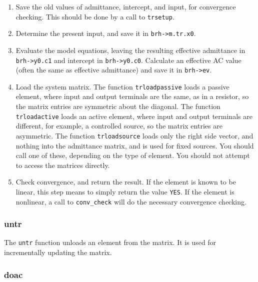 \begin{enumerate}

\item Save the old values of admittance, intercept, and input, for
convergence checking.  This should be done by a call to {\tt trsetup}.

\item Determine the present input, and save it in {\tt brh->m.tr.x0}.

\item Evaluate the model equations, leaving the resulting effective
admittance in {\tt brh->y0.c1} and intercept in {\tt brh->y0.c0}.  Calculate
an effective AC value (often the same as effective admittance) and save it
in {\tt brh->ev}.

\item Load the system matrix.  The function {\tt trloadpassive} loads a
passive element, where input and output terminals are the same, as in a
resistor, so the matrix entries are symmetric about the diagonal.  The
function {\tt trloadactive} loads an active element, where input and output
terminals are different, for example, a controlled source, so the matrix
entries are asymmetric.  The function {\tt trloadsource} loads only the
right side vector, and nothing into the admittance matrix, and is used for
fixed sources.  You should call one of these, depending on the type of
element.  You should not attempt to access the matrices directly.

\item Check convergence, and return the result.  If the element is known to
be linear, this step means to simply return the value {\tt YES}.  If the
element is nonlinear, a call to {\tt conv\_check} will do the necessary
convergence checking.

\end{enumerate}
\subsubsection{untr}

The {\tt untr} function unloads an element from the matrix.  It is used for
incrementally updating the matrix.
\subsubsection{doac}

